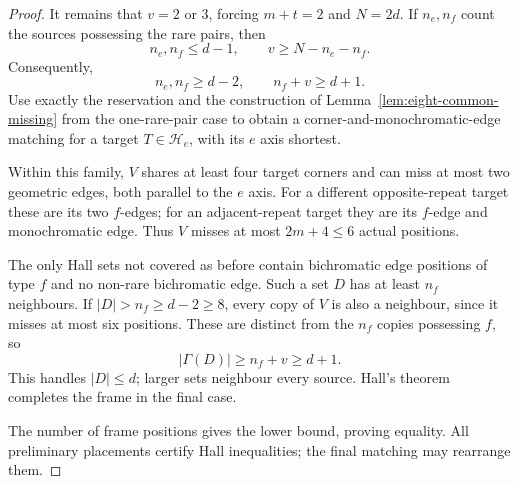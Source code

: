 \begin{proof}
It remains that $v=2$ or $3$, forcing $m+t=2$ and $N=2d$. If $n_e,n_f$
count the sources possessing the rare pairs, then
\[
 n_e,n_f\le d-1,\qquad
 v\ge N-n_e-n_f.
\]
Consequently,
\[
 n_e,n_f\ge d-2,\qquad n_f+v\ge d+1.
\]
Use exactly the reservation and the construction of Lemma~\ref{lem:eight-common-missing} from the
one-rare-pair case to obtain a corner-and-monochromatic-edge matching
for a target $T\in\mathcal H_e$, with its $e$ axis shortest.

Within this family, $V$ shares at least four target corners and can
miss at most two geometric edges, both parallel to the $e$ axis. For
a different opposite-repeat target these are its two $f$-edges; for
an adjacent-repeat target they are its $f$-edge and monochromatic edge.
Thus $V$ misses at most $2m+4\le6$ actual positions.

The only Hall sets not covered as before contain bichromatic edge
positions of type $f$ and no non-rare bichromatic edge. Such a set $D$
has at least $n_f$ neighbours. If $|D|>n_f\ge d-2\ge8$, every copy
of $V$ is also a neighbour, since it misses at most six positions.
These are distinct from the $n_f$ copies possessing $f$, so
\[
 |\Gamma(D)|\ge n_f+v\ge d+1.
\]
This handles $|D|\le d$; larger sets neighbour every source. Hall's
theorem completes the frame in the final case.

The number of frame positions gives the lower bound, proving equality.
All preliminary placements certify Hall inequalities; the final
matching may rearrange them.
\end{proof}

